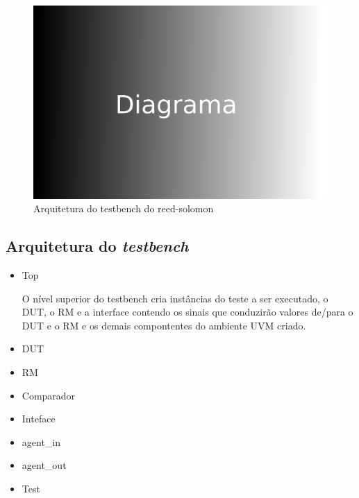 \documentclass[a4paper]{article}
\begin{document}
\begin{figure}[h]
    \centering
        \centering
        \includegraphics[width=\textwidth]{diagrama.png} %
        \caption{Arquitetura do testbench do reed-solomon}
        \label{tb}
\end{figure}

\subsection{Arquitetura do \textit{testbench}}

\begin{itemize}
    \item Top
    
        O nível superior do testbench cria instâncias do teste a ser executado, o DUT, o RM e a interface contendo os sinais que conduzirão valores de/para o DUT e o RM e os demais compontentes do ambiente UVM criado.
        
    \item DUT
    
        
        
        \newpage
        
    \item RM
    
        
        
    \item Comparador
    
        
        
    \item Inteface
    
        
    
    \item agent\_in
        
        
        
    \item agent\_out
        
        
    
    \item Test
        
        
    
\end{itemize}
\end{document}
